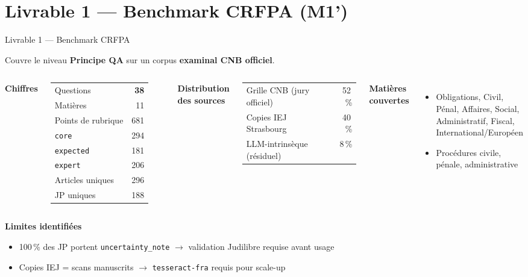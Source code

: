 \documentclass[aspectratio=169,10pt]{beamer}
\newcommand{\keybox}[1]{%
  \begin{center}
  \colorbox{accentsoft}{\parbox{0.92\linewidth}{\centering #1}}
  \end{center}}
\begin{document}
\section{Livrable 1 --- Benchmark CRFPA (M1')}

\begin{frame}{Livrable 1 --- Benchmark CRFPA}
  \keybox{\small Couvre le niveau \textbf{Principe QA} sur un corpus \textbf{examinal CNB officiel}.}

  \begin{columns}[T]
    \textbf{Chiffres}
    \vspace{0.2em}
    \footnotesize
    \begin{tabular}{@{}l r@{}}
      \toprule
      Questions & \textbf{38} \\
      Matières & 11 \\
      Points de rubrique & 681 \\
      \quad \texttt{core}     & 294 \\
      \quad \texttt{expected} & 181 \\
      \quad \texttt{expert}   & 206 \\
      Articles uniques & 296 \\
      JP uniques & 188 \\
      \bottomrule
    \end{tabular}

    \textbf{Distribution des sources}
    \vspace{0.2em}
    \footnotesize
    \begin{tabular}{@{}l r@{}}
      \toprule
      Grille CNB (jury officiel) & 52\,\% \\
      Copies IEJ Strasbourg & 40\,\% \\
      LLM-intrinsèque (résiduel) & 8\,\% \\
      \bottomrule
    \end{tabular}

    \vspace{0.5em}
    \textbf{Matières couvertes}
    \begin{itemize}\scriptsize
      \item Obligations, Civil, Pénal, Affaires, Social, Administratif, Fiscal, International/Européen
      \item Procédures civile, pénale, administrative
    \end{itemize}
  \end{columns}

  \vspace{0.5em}
  \textbf{Limites identifiées}
  \begin{itemize}\footnotesize
    \item 100\,\% des JP portent \texttt{uncertainty\_note} $\to$ validation Judilibre requise avant usage
    \item Copies IEJ = scans manuscrits $\to$ \texttt{tesseract-fra} requis pour scale-up
  \end{itemize}
\end{frame}
\end{document}
